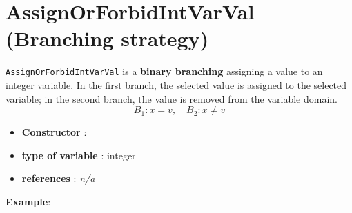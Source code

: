 \section{AssignOrForbidIntVarVal (Branching strategy)}\label{assignorforbidintvarval:assignorforbidintvarvalbranchstrat}\hypertarget{assignorforbidintvarval:assignorforbidintvarvalbranchstrat}{}
\begin{notedef}
  \texttt{AssignOrForbidIntVarVal} is a \textbf{binary branching} assigning a value to an integer variable. In the first branch, the selected value is assigned to the selected variable; in the second branch, the value is removed from the variable domain.
$$B_1: x=v,\quad B_2: x\neq v$$
\end{notedef}

\begin{itemize}
	\item \textbf{Constructor} :
	\item \textbf{type of variable} : integer
	\item \textbf{references} : \emph{n/a}
\end{itemize}

\textbf{Example}:
%

